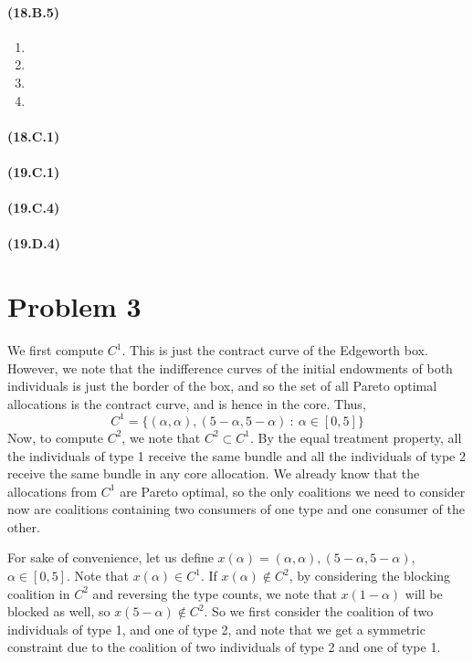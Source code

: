 \documentclass[10pt,letter]{article}
\begin{document}
\paragraph{(18.B.5)}
\begin{enumerate}[label=(\alph*)]
  \item
  \item
  \item
  \item 
\end{enumerate}
\paragraph{(18.C.1)}
\paragraph{(19.C.1)}
\paragraph{(19.C.4)}
\paragraph{(19.D.4)}
\section*{Problem 3}
We first compute $C^1$. This is just the contract curve of the Edgeworth box. However, we note that the indifference curves of the initial endowments of both individuals is just the border of the box, and so the set of all Pareto optimal allocations is the contract curve, and is hence in the core. Thus,
\[ C^1 = \{ (\alpha, \alpha), (5 - \alpha, 5- \alpha) \ : \ \alpha \in [0,5] \} \]
Now, to compute $C^2$, we note that $C^2 \subset C^1$. By the equal treatment property, all the individuals of type 1 receive the same bundle and all the individuals of type 2 receive the same bundle in any core allocation. We already know that the allocations from $C^1$ are Pareto optimal, so the only coalitions we need to consider now are coalitions containing two consumers of one type and one consumer of the other.

For sake of convenience, let us define $x(\alpha) = (\alpha, \alpha), (5-\alpha, 5-\alpha)$, $\alpha \in [0,5]$. Note that $x(\alpha) \in C^1$.  If $ x(\alpha) \not \in C^2$, by considering the blocking coalition in $C^2$ and reversing the type counts, we note that $x(1-\alpha)$ will be blocked as well, so $x(5-\alpha) \not \in C^2$. So we first consider the coalition of two individuals of type 1, and one of type 2, and note that we get a symmetric constraint due to the coalition of two individuals of type 2 and one of type 1.
\end{document}
